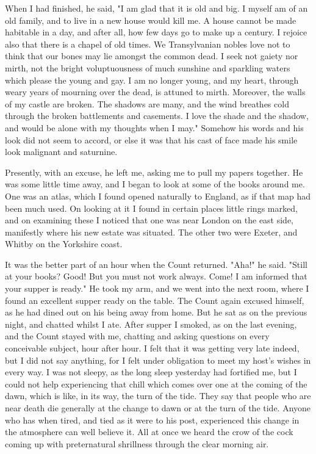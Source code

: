 When I had finished, he said, "I am glad that it is old and big. I myself am of an old family, and to live in a new house would kill me. A house cannot be made habitable in a day, and after all, how few days go to make up a century. I rejoice also that there is a chapel of old times. We Transylvanian nobles love not to think that our bones may lie amongst the common dead. I seek not gaiety nor mirth, not the bright voluptuousness of much sunshine and sparkling waters which please the young and gay. I am no longer young, and my heart, through weary years of mourning over the dead, is attuned to mirth. Moreover, the walls of my castle are broken. The shadows are many, and the wind breathes cold through the broken battlements and casements. I love the shade and the shadow, and would be alone with my thoughts when I may." Somehow his words and his look did not seem to accord, or else it was that his cast of face made his smile look malignant and saturnine. 

Presently, with an excuse, he left me, asking me to pull my papers together. He was some little time away, and I began to look at some of the books around me. One was an atlas, which I found opened naturally to England, as if that map had been much used. On looking at it I found in certain places little rings marked, and on examining these I noticed that one was near London on the east side, manifestly where his new estate was situated. The other two were Exeter, and Whitby on the Yorkshire coast. 

It was the better part of an hour when the Count returned. "Aha!" he said. "Still at your books? Good! But you must not work always. Come! I am informed that your supper is ready." He took my arm, and we went into the next room, where I found an excellent supper ready on the table. The Count again excused himself, as he had dined out on his being away from home. But he sat as on the previous night, and chatted whilst I ate. After supper I smoked, as on the last evening, and the Count stayed with me, chatting and asking questions on every conceivable subject, hour after hour. I felt that it was getting very late indeed, but I did not say anything, for I felt under obligation to meet my host's wishes in every way. I was not sleepy, as the long sleep yesterday had fortified me, but I could not help experiencing that chill which comes over one at the coming of the dawn, which is like, in its way, the turn of the tide. They say that people who are near death die generally at the change to dawn or at the turn of the tide. Anyone who has when tired, and tied as it were to his post, experienced this change in the atmosphere can well believe it. All at once we heard the crow of the cock coming up with preternatural shrillness through the clear morning air. 


